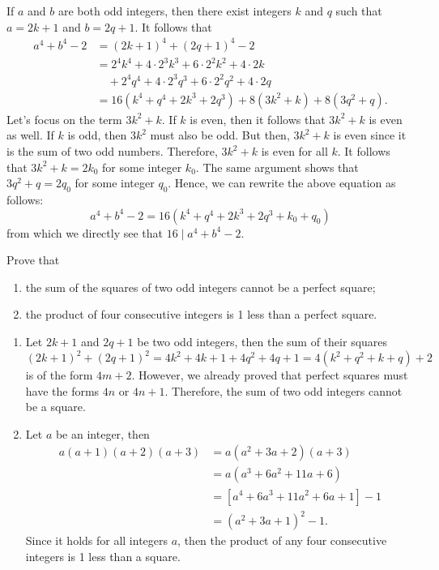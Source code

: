\begin{solution}
    If $a$ and $b$ are both odd integers, then there exist integers $k$ and $q$ such that $a = 2k+1$ and $b = 2q+1$. It follows that
    \begin{align*}
        a^4 + b^4 - 2 &= (2k+1)^4 + (2q+1)^4 - 2 \\
        &= 2^4k^4 + 4\cdot 2^3k^3 + 6\cdot 2^2 k^2 + 4\cdot 2k \\
        & \quad + 2^4q^4 + 4\cdot 2^3q^3 + 6\cdot 2^2 q^2 + 4\cdot 2q \\
        &= 16(k^4 + q^4 + 2k^3 + 2q^3) + 8(3k^2 + k) + 8(3q^2 + q).
    \end{align*}
    Let's focus on the term $3k^2 + k$. If $k$ is even, then it follows that $3k^2 + k$ is even as well. If $k$ is odd, then $3k^2$ must also be odd. But then, $3k^2 + k$ is even since it is the sum of two odd numbers. Therefore, $3k^2 + k$ is even for all $k$. It follows that $3k^2 + k = 2k_0$ for some integer $k_0$. The same argument shows that $3q^2 + q = 2q_0$ for some integer $q_0$. Hence, we can rewrite the above equation as follows:
    $$a^4 + b^4 - 2 = 16(k^4 + q^4 + 2k^3 + 2q^3 + k_0 + q_0)$$
    from which we directly see that $16 \mid a^4 + b^4 - 2$.\\
\end{solution}

\begin{exercise}
    Prove that
    \begin{enumerate}
        \item the sum of the squares of two odd integers cannot be a perfect square;
        \item the product of four consecutive integers is 1 less than a perfect square.
    \end{enumerate}
\end{exercise}

\begin{solution}
    \begin{enumerate}
        \item Let $2k+1$ and $2q+1$ be two odd integers, then the sum of their squares
        $$(2k+1)^2 + (2q+1)^2 = 4k^2 + 4k + 1 + 4q^2 + 4q + 1 = 4(k^2 + q^2 + k + q) + 2$$
        is of the form $4m + 2$. However, we already proved that perfect squares must have the forms $4n$ or $4n+1$. Therefore, the sum of two odd integers cannot be a square.
        \item Let $a$ be an integer, then
        \begin{align*}
            a(a+1)(a+2)(a+3) &= a(a^2 + 3a + 2)(a+3) \\
            &= a(a^3 + 6a^2 + 11a + 6) \\
            &= [a^4 + 6a^3 + 11a^2 + 6a + 1] - 1 \\
            &= (a^2 + 3a + 1)^2 - 1.
        \end{align*}
        Since it holds for all integers $a$, then the product of any four consecutive integers is 1 less than a square.
    \end{enumerate}
\end{solution}

